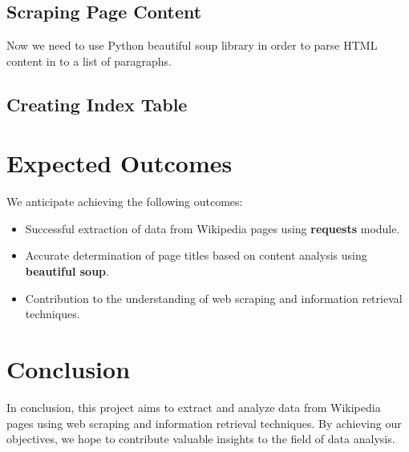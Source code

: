 \documentclass{article}
\begin{document}
\subsection{Scraping Page Content}
Now we need to use Python beautiful soup library in order to parse HTML content in to a list of paragraphs.

\subsection{Creating Index Table}

\section{Expected Outcomes}
We anticipate achieving the following outcomes:
\begin{itemize}
    \item Successful extraction of data from Wikipedia pages using \textbf{requests} module.
    \item Accurate determination of page titles based on content analysis using \textbf{beautiful soup}.
    \item Contribution to the understanding of web scraping and information retrieval techniques.
\end{itemize}

\section{Conclusion}
In conclusion, this project aims to extract and analyze data from Wikipedia pages using web scraping and information retrieval techniques. By achieving our objectives, we hope to contribute valuable insights to the field of data analysis.

% 
% 
\end{document}
